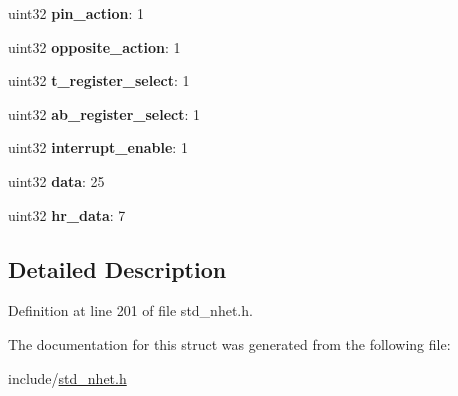 \begin{DoxyCompactItemize}
uint32 {\bfseries pin\+\_\+action}\+: 1
\item 
\mbox{\label{structmcmp__format_a136b2ed84358f202ab0d0102b073a587}} 
uint32 {\bfseries opposite\+\_\+action}\+: 1
\item 
\mbox{\label{structmcmp__format_a11765ced0f9c399e6a699b0031982bfa}} 
uint32 {\bfseries t\+\_\+register\+\_\+select}\+: 1
\item 
\mbox{\label{structmcmp__format_aab949bd1ed6945b468c14d0edfe6a9f7}} 
uint32 {\bfseries ab\+\_\+register\+\_\+select}\+: 1
\item 
\mbox{\label{structmcmp__format_a163853f5618d6108ea81610519f85565}} 
uint32 {\bfseries interrupt\+\_\+enable}\+: 1
\item 
\mbox{\label{structmcmp__format_a1f3cbb284c9bb57338edf8a912666ab5}} 
uint32 {\bfseries data}\+: 25
\item 
\mbox{\label{structmcmp__format_aee2d5bf95103a69cb2ed7fcb72e4a63a}} 
uint32 {\bfseries hr\+\_\+data}\+: 7
\end{DoxyCompactItemize}


\subsection{Detailed Description}


Definition at line 201 of file std\+\_\+nhet.\+h.



The documentation for this struct was generated from the following file\+:\begin{DoxyCompactItemize}
\item 
include/\mbox{\hyperlink{std__nhet_8h}{std\+\_\+nhet.\+h}}\end{DoxyCompactItemize}
